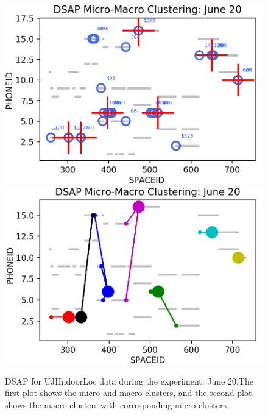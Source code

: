   
 
 








\begin{figure}[!ht]
    \centering
    \includegraphics[width=.6\textwidth]{image/Chapters/Chapter6/DSAPJune20.png}
    \includegraphics[width=.6\textwidth]{image/Chapters/Chapter6/DSAPJune20Macro.png}
    \\[\smallskipamount]    
    \caption{ DSAP for UJIIndoorLoc data during the experiment: June 20.The first plot shows the micro and macro-clusters, and the second plot shows the macro-clusters with corresponding micro-clusters.}
    \label{dsapjun20}
\end{figure}





